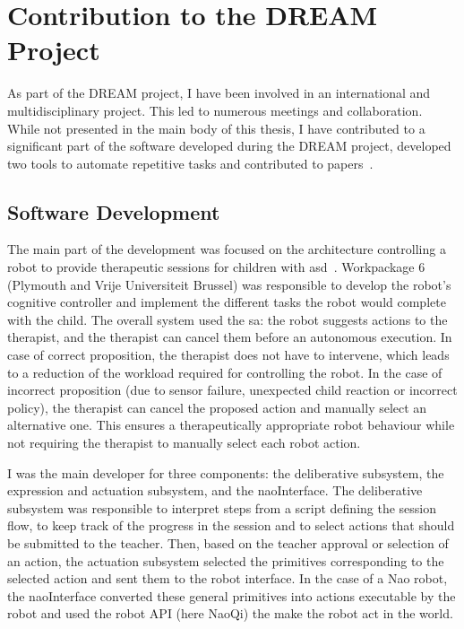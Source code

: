 \cleartooddpage
\chapter{Contribution to the DREAM Project} \label{app:dream}
\glsresetall

As part of the DREAM project, I have been involved in an international and multidisciplinary project. This led to numerous meetings and collaboration. While not presented in the main body of this thesis, I have contributed to a significant part of the software developed during the DREAM project, developed two tools to automate repetitive tasks and contributed to papers~\citep{esteban2017build,cao2018personalized}.

\section{Software Development}

The main part of the development was focused on the architecture controlling a robot to provide therapeutic sessions for children with \gls{asd}~\citep{esteban2017build}. Workpackage 6 (Plymouth and Vrije Universiteit Brussel) was responsible to develop the robot's cognitive controller and implement the different tasks the robot would complete with the child. The overall system used the \gls{sa}: the robot suggests actions to the therapist, and the therapist can cancel them before an autonomous execution. In case of correct proposition, the therapist does not have to intervene, which leads to a reduction of the workload required for controlling the robot. In the case of incorrect proposition (due to sensor failure, unexpected child reaction or incorrect policy), the therapist can cancel the proposed action and manually select an alternative one. This ensures a therapeutically appropriate robot behaviour while not requiring the therapist to manually select each robot action. 

I was the main developer for three components: the deliberative subsystem, the expression and actuation subsystem, and the naoInterface. The deliberative subsystem was responsible to interpret steps from a script defining the session flow, to keep track of the progress in the session and to select actions that should be submitted to the teacher. Then, based on the teacher approval or selection of an action, the actuation subsystem selected the primitives corresponding to the selected  action and sent them to the robot interface. In the case of a Nao robot, the naoInterface converted these general primitives into actions executable by the robot and used the robot API (here NaoQi) the make the robot act in the world. 

